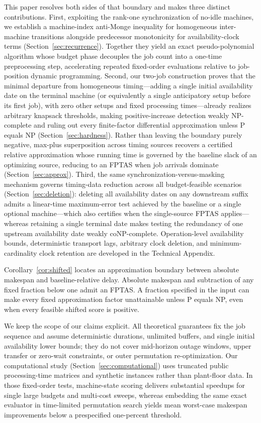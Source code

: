 \documentclass[11pt,letterpaper]{article}
\begin{document}
This paper resolves both sides of that boundary and makes three distinct contributions. First, exploiting the rank-one synchronization of no-idle machines, we establish a machine-index anti-Monge inequality for homogeneous inter-machine transitions alongside predecessor monotonicity for availability-clock terms (Section~\ref{sec:recurrence}). Together they yield an exact pseudo-polynomial algorithm whose budget phase decouples the job count into a one-time preprocessing step, accelerating repeated fixed-order evaluations relative to job-position dynamic programming. Second, our two-job construction proves that the minimal departure from homogeneous timing---adding a single initial availability date on the terminal machine (or equivalently a single anticipatory setup before its first job), with zero other setups and fixed processing times---already realizes arbitrary knapsack thresholds, making positive-increase detection weakly NP-complete and ruling out every finite-factor differential approximation unless P equals NP (Section~\ref{sec:hardness}). Rather than leaving the boundary purely negative, max-plus superposition across timing sources recovers a certified relative approximation whose running time is governed by the baseline slack of an optimizing source, reducing to an FPTAS when job arrivals dominate (Section~\ref{sec:approx}). Third, the same synchronization-versus-masking mechanism governs timing-data reduction across all budget-feasible scenarios (Section~\ref{sec:deletion}): deleting all availability dates on any downstream suffix admits a linear-time maximum-error test achieved by the baseline or a single optional machine---which also certifies when the single-source FPTAS applies---whereas retaining a single terminal date makes testing the redundancy of one upstream availability date weakly coNP-complete. Operation-level availability bounds, deterministic transport lags, arbitrary clock deletion, and minimum-cardinality clock retention are developed in the Technical Appendix.

Corollary~\ref{cor:shifted} locates an approximation boundary between absolute makespan and baseline-relative delay. Absolute makespan and subtraction of any fixed fraction below one admit an FPTAS. A fraction specified in the input can make every fixed approximation factor unattainable unless P equals NP, even when every feasible shifted score is positive.

We keep the scope of our claims explicit. All theoretical guarantees fix the job sequence and assume deterministic durations, unlimited buffers, and single initial availability lower bounds; they do not cover mid-horizon outage windows, upper transfer or zero-wait constraints, or outer permutation re-optimization. Our computational study (Section~\ref{sec:computational}) uses truncated public processing-time matrices and synthetic instances rather than plant-floor data. In those fixed-order tests, machine-state scoring delivers substantial speedups for single large budgets and multi-cost sweeps, whereas embedding the same exact evaluator in time-limited permutation search yields mean worst-case makespan improvements below a prespecified one-percent threshold.
\end{document}
